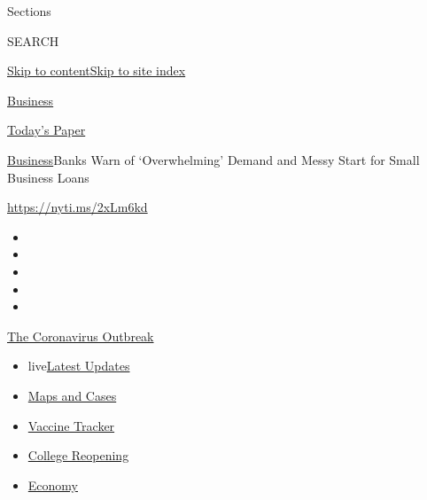Sections

SEARCH

\protect\hyperlink{site-content}{Skip to
content}\protect\hyperlink{site-index}{Skip to site index}

\href{https://www.nytimes.com/section/business}{Business}

\href{https://myaccount.nytimes.com/auth/login?response_type=cookie\&client_id=vi}{}

\href{https://www.nytimes.com/section/todayspaper}{Today's Paper}

\href{/section/business}{Business}\textbar{}Banks Warn of `Overwhelming'
Demand and Messy Start for Small Business Loans

\url{https://nyti.ms/2xLm6kd}

\begin{itemize}
\item
\item
\item
\item
\item
\end{itemize}

\href{https://www.nytimes.com/news-event/coronavirus?action=click\&pgtype=Article\&state=default\&region=TOP_BANNER\&context=storylines_menu}{The
Coronavirus Outbreak}

\begin{itemize}
\tightlist
\item
  live\href{https://www.nytimes.com/2020/08/04/world/coronavirus-covid-19.html?action=click\&pgtype=Article\&state=default\&region=TOP_BANNER\&context=storylines_menu}{Latest
  Updates}
\item
  \href{https://www.nytimes.com/interactive/2020/us/coronavirus-us-cases.html?action=click\&pgtype=Article\&state=default\&region=TOP_BANNER\&context=storylines_menu}{Maps
  and Cases}
\item
  \href{https://www.nytimes.com/interactive/2020/science/coronavirus-vaccine-tracker.html?action=click\&pgtype=Article\&state=default\&region=TOP_BANNER\&context=storylines_menu}{Vaccine
  Tracker}
\item
  \href{https://www.nytimes.com/2020/08/02/us/covid-college-reopening.html?action=click\&pgtype=Article\&state=default\&region=TOP_BANNER\&context=storylines_menu}{College
  Reopening}
\item
  \href{https://www.nytimes.com/live/2020/08/03/business/stock-market-today-coronavirus?action=click\&pgtype=Article\&state=default\&region=TOP_BANNER\&context=storylines_menu}{Economy}
\end{itemize}

